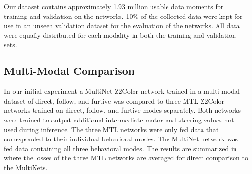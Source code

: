 Our dataset contains approximately 1.93 million usable data moments for training and validation on the networks. 10\% of the collected data were kept for use in an unseen validation dataset for the evaluation of the networks. All data were equally distributed for each modality in both the training and validation sets. 

\subsection{Multi-Modal Comparison}
In our initial experiment a MultiNet Z2Color network trained in a multi-modal dataset of direct, follow, and furtive was compared to three MTL Z2Color networks trained on direct, follow, and furtive modes separately. Both networks were trained to output additional intermediate motor and steering values not used during inference. The three MTL networks were only fed data that corresponded to their individual behavioral modes. The MultiNet network was fed data containing all three behavioral modes. The results are summarized in  where the losses of the three MTL networks are averaged for direct comparison to the MultiNets.

